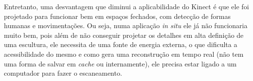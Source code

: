 Entretanto, uma desvantagem que diminui a aplicabilidade do Kinect é que ele foi projetado para funcionar bem em espaços fechados, com detecção de formas humanas e movimentações. Ou seja, numa aplicação {\it in situ} ele já não funcionaria muito bem, pois além de não conseguir projetar os detalhes em alta definição de uma escultura, ele necessita de uma fonte de energia externa, o que dificulta a acessibilidade do mesmo e como gera uma reconstrução em tempo real (não tem uma forma de salvar em {\it cache} ou internamente), ele precisa estar ligado a um computador para fazer o escaneamento.
